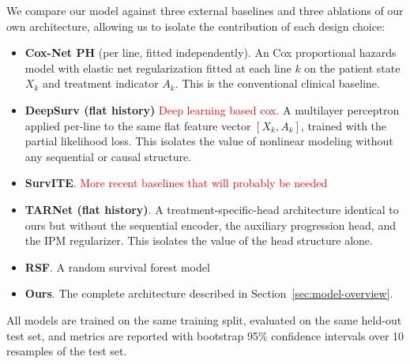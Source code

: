 \documentclass[a4paper,10pt]{article}
\begin{document}
We compare our model against three external baselines and three ablations of our own architecture, allowing us to isolate the contribution of each design choice:

\begin{itemize}
    \item \textbf{Cox-Net PH} (per line, fitted independently). An Cox proportional hazards model with elastic net regularization fitted at each line $k$ on the patient state $X_k$ and treatment indicator $A_k$. This is the conventional clinical baseline.
    \item \textbf{DeepSurv (flat history) } \textcolor{red}{Deep learning based cox}. A multilayer perceptron applied per-line to the same flat feature vector $[X_k, A_k]$, trained with the partial likelihood loss. This isolates the value of nonlinear modeling without any sequential or causal structure.
    \item \textbf{SurvITE}. \textcolor{red}{More recent baselines that will probably be needed} 
    \item \textbf{TARNet (flat history)}. A treatment-specific-head architecture identical to ours but without the sequential encoder, the auxiliary progression head, and the IPM regularizer. This isolates the value of the head structure alone.
    \item \textbf{RSF}. A random survival forest model 
    \item \textbf{Ours}. The complete architecture described in Section~\ref{sec:model-overview}.
\end{itemize}

All models are trained on the same training split, evaluated on the same held-out test set, and metrics are reported with bootstrap 95\% confidence intervals over 10 resamples of the test set.
\end{document}
